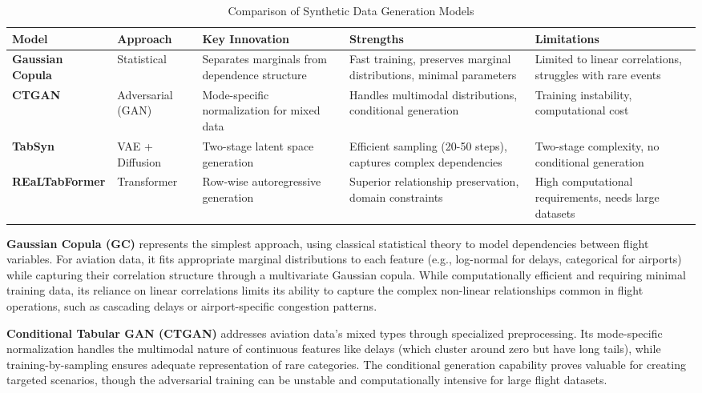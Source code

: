 \documentclass[conference]{IEEEtran}
\begin{document}
\begin{table}[htbp]
\centering
\caption{Comparison of Synthetic Data Generation Models}
\label{tab:generator_comparison}
\small
\begin{tabularx}{\textwidth}{l l X X X}
\toprule
\textbf{Model} & \textbf{Approach} & \textbf{Key Innovation} & \textbf{Strengths} & \textbf{Limitations} \\
\midrule
\textbf{Gaussian Copula} & Statistical & Separates marginals from dependence structure & Fast training, preserves marginal distributions, minimal parameters & Limited to linear correlations, struggles with rare events \\
\midrule
\textbf{CTGAN} & Adversarial (GAN) & Mode-specific normalization for mixed data & Handles multimodal distributions, conditional generation & Training instability, computational cost \\
\midrule
\textbf{TabSyn} & VAE + Diffusion & Two-stage latent space generation & Efficient sampling (20-50 steps), captures complex dependencies & Two-stage complexity, no conditional generation \\
\midrule
\textbf{REaLTabFormer} & Transformer & Row-wise autoregressive generation & Superior relationship preservation, domain constraints & High computational requirements, needs large datasets \\
\bottomrule
\end{tabularx}
\end{table}


\textbf{Gaussian Copula (GC)} represents the simplest approach, using classical statistical theory to model dependencies between flight variables. For aviation data, it fits appropriate marginal distributions to each feature (e.g., log-normal for delays, categorical for airports) while capturing their correlation structure through a multivariate Gaussian copula. While computationally efficient and requiring minimal training data, its reliance on linear correlations limits its ability to capture the complex non-linear relationships common in flight operations, such as cascading delays or airport-specific congestion patterns.

\textbf{Conditional Tabular GAN (CTGAN)} \cite{xu2019modeling} addresses aviation data's mixed types through specialized preprocessing. Its mode-specific normalization handles the multimodal nature of continuous features like delays (which cluster around zero but have long tails), while training-by-sampling ensures adequate representation of rare categories. The conditional generation capability proves valuable for creating targeted scenarios, though the adversarial training can be unstable and computationally intensive for large flight datasets.
\end{document}
